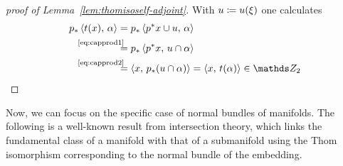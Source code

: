 \begin{proof}[proof of Lemma~\ref{lem:thomisoself-adjoint}]
  With $u\coloneqq{u}(\xi)$ one calculates
  \begin{align*}
    \pf p\capped{\thomiso(x)}{\alpha}
    &= \pf p\capped{\pb p x \cup \U}{\alpha} \\
    &\equalsby{\eqref{eq:capprod1}}
      \pf p\capped{\pb p x}{\U\cap\alpha} \\
    &\equalsby{\eqref{eq:capprod2}}
      \capped{x}{\pf p(u\cap\alpha)}
      = \capped{x}{\thomiso (\alpha)} \in\Zmod2
      \qedhere
  \end{align*}
\end{proof}

Now, we can focus on the specific case of normal bundles of manifolds.
The following is a well-known result from intersection theory, which
links the fundamental class of a manifold with that of a submanifold
using the Thom isomorphism corresponding to the normal bundle of the
embedding.
